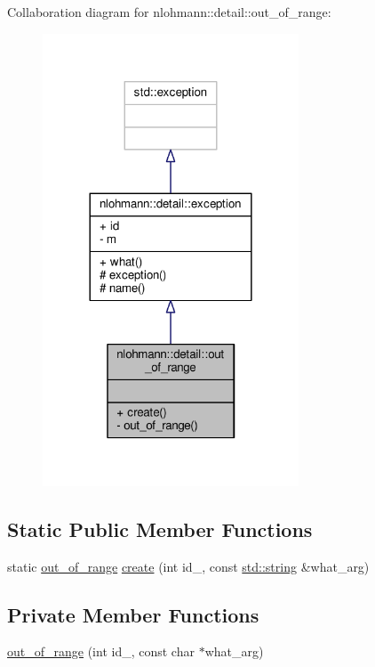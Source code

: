 Collaboration diagram for nlohmann\+:\+:detail\+:\+:out\+\_\+of\+\_\+range\+:
\nopagebreak
\begin{figure}[H]
\begin{center}
\leavevmode
\includegraphics[width=216pt]{classnlohmann_1_1detail_1_1out__of__range__coll__graph}
\end{center}
\end{figure}
\subsection*{Static Public Member Functions}
\begin{DoxyCompactItemize}
\item 
static \hyperlink{classnlohmann_1_1detail_1_1out__of__range}{out\+\_\+of\+\_\+range} \hyperlink{classnlohmann_1_1detail_1_1out__of__range_a3f6d82a6f967c4728a1ec735a7867073}{create} (int id\+\_\+, const \hyperlink{namespacenlohmann_1_1detail_a1ed8fc6239da25abcaf681d30ace4985ab45cffe084dd3d20d928bee85e7b0f21}{std\+::string} \&what\+\_\+arg)
\end{DoxyCompactItemize}
\subsection*{Private Member Functions}
\begin{DoxyCompactItemize}
\item 
\hyperlink{classnlohmann_1_1detail_1_1out__of__range_ab5fe402019dba957558499502f0fd731}{out\+\_\+of\+\_\+range} (int id\+\_\+, const char $\ast$what\+\_\+arg)
\end{DoxyCompactItemize}
